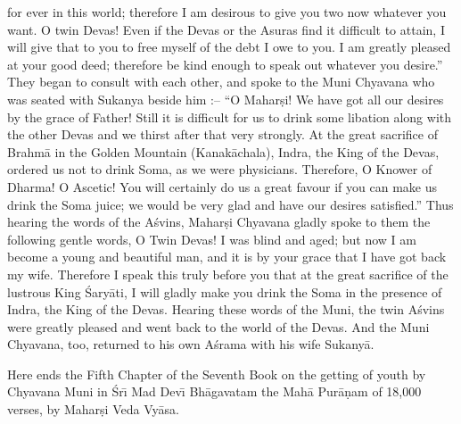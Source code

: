 for ever in this world; therefore I am desirous to give you two now whatever you want. O twin Devas! Even if the Devas or the Asuras find it difficult to attain, I will give that to you to free myself of the debt I owe to you. I am greatly pleased at your good deed; therefore be kind enough to speak out whatever you desire.'' They began to consult with each other, and spoke to the Muni Chyavana who was seated with Sukanya beside him :-- ``O Mahar\d{s}i! We have got all our desires by the grace of Father! Still it is difficult for us to drink some libation along with the other Devas and we thirst after that very strongly. At the great sacrifice of Brahm\=a in the Golden Mountain (Kanak\=achala), Indra, the King of the Devas, ordered us not to drink Soma, as we were physicians. Therefore, O Knower of Dharma! O Ascetic! You will certainly do us a great favour if you can make us drink the Soma juice; we would be very glad and have our desires satisfied.'' Thus hearing the words of the A\'svins, Mahar\d{s}i Chyavana gladly spoke to them the following gentle words, O Twin Devas! I was blind and aged; but now I am become a young and beautiful man, and it is by your grace that I have got back my wife. Therefore I speak this truly before you that at the great sacrifice of the lustrous King \'Sary\=ati, I will gladly make you drink the Soma in the presence of Indra, the King of the Devas. Hearing these words of the Muni, the twin A\'svins were greatly pleased and went back to the world of the Devas. And the Muni Chyavana, too, returned to his own A\'srama with his wife Sukany\=a.

Here ends the Fifth Chapter of the Seventh Book on the getting of youth by Chyavana Muni in \'Sr\={\i} Mad Dev\={\i} Bh\=agavatam the Mah\=a Pur\=a\d{n}am of 18,000 verses, by Mahar\d{s}i Veda Vy\=asa.



